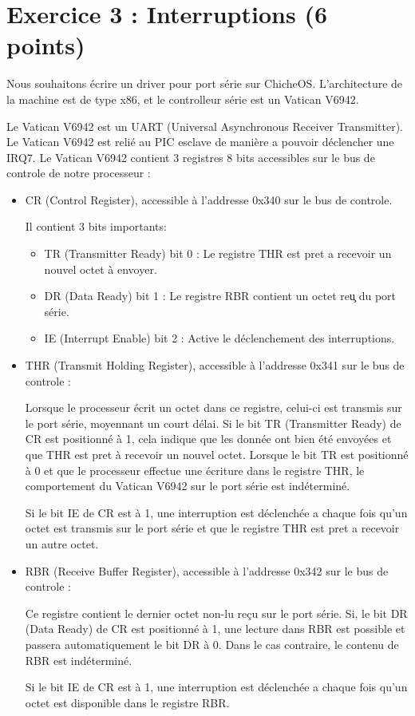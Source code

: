 \section*{Exercice 3 : Interruptions (6 points)}

Nous souhaitons \'ecrire un driver pour port s\'erie sur ChicheOS.
L'architecture de la machine est de type x86, et le controlleur s\'erie
est un Vatican V6942.

Le Vatican V6942 est un UART (Universal Asynchronous Receiver Transmitter).
Le Vatican V6942 est reli\'e au PIC esclave de mani\`ere a pouvoir
d\'eclencher une IRQ7.
Le Vatican V6942 contient 3 registres 8 bits accessibles sur le bus de
controle de notre processeur :

\begin{itemize}
  \item CR (Control Register), accessible \`a l'addresse 0x340 sur le bus
  de controle.

  Il contient 3 bits importants:
  \begin{itemize}
    \item TR (Transmitter Ready) bit 0 : Le registre THR est pret a recevoir un nouvel octet \`a envoyer.
    \item DR (Data Ready) bit 1 : Le registre RBR contient un octet re\c{u} du port s\'erie.
    \item IE (Interrupt Enable) bit 2 : Active le d\'eclenchement des interruptions.
  \end{itemize}

  \item THR (Transmit Holding Register), accessible \`a l'addresse 0x341 sur
  le bus de controle : 
  
  Lorsque le processeur \'ecrit un octet dans ce registre,
  celui-ci est transmis sur le port s\'erie, moyennant un court d\'elai. Si
  le bit TR (Transmitter Ready) de CR est positionn\'e \`a 1, cela indique
  que les donn\'ee ont bien \'et\'e envoy\'ees et
  que THR est pret \`a recevoir un nouvel octet. Lorsque le bit TR est
  positionn\'e \`a 0 et que le processeur effectue une \'ecriture dans le registre
  THR, le comportement du Vatican V6942 sur le port s\'erie est ind\'etermin\'e.

  Si le bit IE de CR est \`a 1, une interruption est d\'eclench\'ee a chaque fois
  qu'un octet est transmis sur le port s\'erie et que le registre THR est pret
  a recevoir un autre octet.

  \item RBR (Receive Buffer Register), accessible \`a l'addresse 0x342 sur
  le bus de controle :

  Ce registre contient le dernier octet non-lu re\c{c}u sur le port s\'erie.
  Si, le bit DR (Data Ready) de CR est positionn\'e \`a 1, une lecture dans RBR
  est possible et passera automatiquement le bit DR \`a 0.
  Dans le cas contraire, le contenu de RBR est ind\'etermin\'e.

  Si le bit IE de CR est \`a 1, une interruption est d\'eclench\'ee a chaque fois
  qu'un octet est disponible dans le registre RBR.

\end{itemize}

